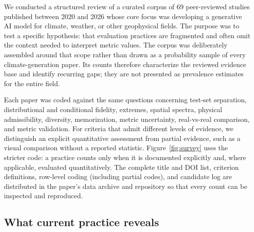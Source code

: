\documentclass[gmd, manuscript]{copernicus}
\begin{document}
We conducted a structured review of a curated corpus of 69 peer-reviewed studies
published between 2020 and 2026 whose core focus was developing a generative AI model
for climate, weather, or other geophysical fields. The purpose was to test a specific
hypothesis: that evaluation practices are fragmented and often omit the context
needed to interpret metric values. The corpus was deliberately assembled around that
scope rather than drawn as a probability sample of every climate-generation paper.
Its counts therefore characterize the reviewed evidence base and identify recurring
gaps; they are not presented as prevalence estimates for the entire field.

Each paper was coded against the same questions concerning test-set separation, distributional and
conditional fidelity, extremes, spatial spectra, physical admissibility, diversity,
memorization, metric uncertainty, real-vs-real comparison, and metric validation. For
criteria that admit different levels of evidence, we distinguish an
explicit quantitative assessment from partial evidence, such as a visual comparison
without a reported statistic. Figure~\ref{fig:survey} uses the stricter code: a
practice counts only when it is documented explicitly and, where applicable,
evaluated quantitatively. The complete title and DOI list, criterion definitions,
row-level coding (including partial codes), and candidate log are distributed in the
paper's data archive and repository so that every count can be inspected and
reproduced.
\nocite{survey01,survey02,survey03,survey04,survey05,survey06,survey07,survey08,survey09,survey10,
survey11,survey12,survey13,survey14,survey15,survey16,survey17,survey18,survey19,survey20,
survey21,survey22,survey23,survey24,survey25,survey26,survey27,survey28,survey29,survey30,
survey31,survey32,survey33,survey34,survey35,survey36,survey37,survey38,survey39,survey40,
survey41,survey42,survey43,survey44,survey45,survey46,survey47,survey48,survey49,survey50,
survey51,survey52,survey53,survey54,survey55,survey56,survey57,survey58,survey59,survey60,
survey61,survey62,survey63,survey64,survey65,survey66,survey67,survey68,survey69}

\subsection{What current practice reveals}
\end{document}
